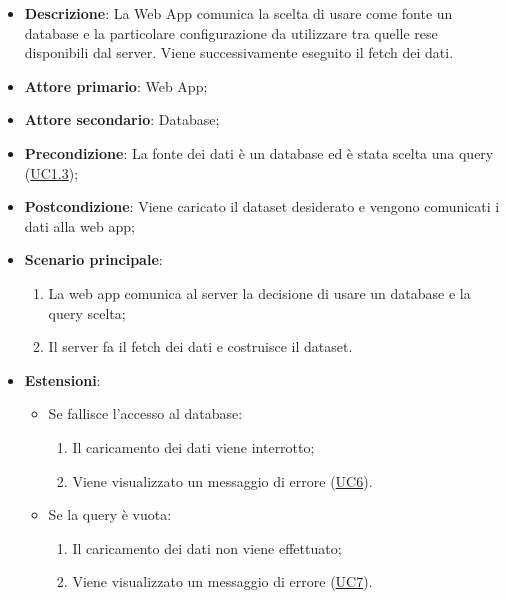 \begin{itemize}

	\item \textbf{Descrizione}: La Web App comunica la scelta di usare come fonte un database e la particolare configurazione da utilizzare tra quelle 
	rese disponibili dal server. Viene successivamente eseguito il fetch dei dati.
	
    \item \textbf{Attore primario}: Web App;
	\item \textbf{Attore secondario}: Database;
	        
    \item \textbf{Precondizione}:   La fonte dei dati è un database ed è stata scelta una query (\hyperref[ssub:uc1.3]{UC1.3});

    \item \textbf{Postcondizione}:  Viene caricato il dataset desiderato e vengono comunicati i dati alla web app;

	\item \textbf{Scenario principale}:
		\begin{enumerate}
			\item La web app comunica al server la decisione di usare un database e la query scelta;
            \item Il server fa il fetch dei dati e costruisce il dataset.
        \end{enumerate}
		
	\item \textbf{Estensioni}:
		\begin{itemize}
		
			\item Se fallisce l'accesso al database:
			\begin{enumerate}
				
				\item Il caricamento dei dati viene interrotto;
				\item Viene visualizzato un messaggio di errore (\hyperref[sub:uc6]{UC6}).
				
			\end{enumerate}
		
			\item Se la query è vuota:
			\begin{enumerate}
				
				\item Il caricamento dei dati non viene effettuato;
				\item Viene visualizzato un messaggio di errore (\hyperref[sub:uc7]{UC7}).
				
			\end{enumerate}
		
		\end{itemize}
			
\end{itemize}